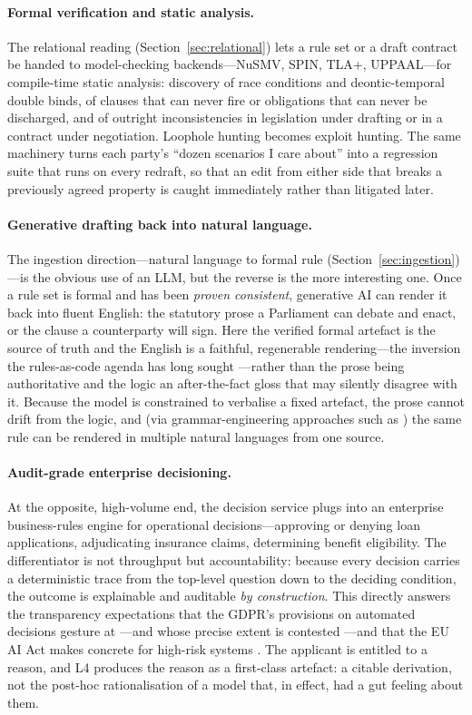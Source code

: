 \documentclass[sigconf,nonacm]{acmart}
\begin{document}
\paragraph{Formal verification and static analysis.}
The relational reading (Section~\ref{sec:relational}) lets a rule set or a
draft contract be handed to model-checking backends---NuSMV, SPIN, TLA+,
UPPAAL---for compile-time static analysis: discovery of race conditions and
deontic-temporal double binds, of clauses that can never fire or
obligations that can never be discharged, and of outright inconsistencies in
legislation under drafting or in a contract under negotiation. Loophole
hunting becomes exploit hunting. The same machinery turns each party's
``dozen scenarios I care about'' into a regression suite that runs on every
redraft, so that an edit from either side that breaks a previously agreed
property is caught immediately rather than litigated later.

\paragraph{Generative drafting back into natural language.}
The ingestion direction---natural language to formal rule
(Section~\ref{sec:ingestion})---is the obvious use of an LLM, but the
reverse is the more interesting one. Once a rule set
is formal and has been \emph{proven consistent}, generative AI can render it
back into fluent English: the statutory prose a Parliament can debate and
enact, or the clause a counterparty will sign. Here the verified formal
artefact is the source of truth and the English is a faithful, regenerable
rendering---the inversion the rules-as-code agenda has long sought
\cite{mohun2020rulesascode}---rather than the prose being authoritative and
the logic an after-the-fact gloss that may silently disagree with it. Because
the model is constrained to verbalise a fixed artefact, the prose cannot
drift from the logic, and (via grammar-engineering approaches such as
\cite{ranta2004gf}) the same rule can be rendered in multiple natural
languages from one source.

\paragraph{Audit-grade enterprise decisioning.}
At the opposite, high-volume end, the decision service plugs into an
enterprise business-rules engine for operational decisions---approving or
denying loan applications, adjudicating insurance claims, determining
benefit eligibility. The differentiator is not throughput but
accountability: because every decision carries a deterministic trace from
the top-level question down to the deciding condition, the outcome is
explainable and auditable \emph{by construction}. This directly answers the
transparency expectations that the GDPR's provisions on automated decisions
gesture at \cite{gdpr2016}---and whose precise extent is contested
\cite{wachter2017explanation}---and that the EU AI Act makes concrete for
high-risk systems \cite{aiact2024}. The applicant is entitled to a reason,
and L4 produces the reason as a first-class artefact: a citable derivation,
not the post-hoc rationalisation of a model that, in effect, had a gut
feeling about them.
\end{document}
